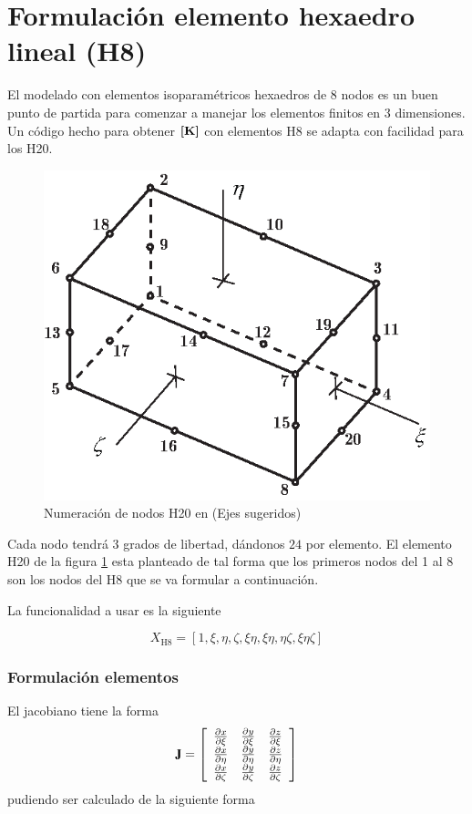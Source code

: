 \section{Formulación elemento hexaedro lineal (H8)}
El modelado con elementos isoparamétricos hexaedros de 8 nodos es un buen punto de partida para comenzar a manejar los elementos finitos en 3 dimensiones. Un código hecho para obtener $\boldsymbol{[}\mathbf{K} \boldsymbol{]}$ con elementos H8 se adapta con facilidad para los H20.

\begin{figure}[htb!]
    \centering
    \includegraphics[width=.6\textwidth]{fig/H20numbering.eps}
    \caption{Numeración de nodos H20 en \Adina (Ejes sugeridos)}
    \label{fig:H20numbering}
\end{figure}

Cada nodo tendrá $3$ grados de libertad, dándonos $24$ \dof{} por elemento. El elemento H20 de la figura \ref{fig:H20numbering} esta planteado de tal forma que los primeros nodos del 1 al 8 son los nodos del H8 que se va formular a continuación.

La funcionalidad a usar es la siguiente

\[
X_{\mathrm{H8}} = \left[1, \xi, \eta, \zeta, \xi \eta, \xi \eta, \eta \zeta, \xi \eta \zeta \right]
\]



\subsubsection*{Formulación elementos}
El jacobiano tiene la forma
\[
\jac=
\left[\begin{array}{lll}\spartial{x}{\xi} & \spartial{y}{\xi}  & \spartial{z}{\xi}  \\ \spartial{x}{\eta}  &\spartial{y}{\eta}  &\spartial{z}{\eta} \\\spartial{x}{\zeta} & \spartial{y}{\zeta} &\spartial{z}{\zeta}\end{array}\right]
\]
pudiendo ser calculado de la siguiente forma

